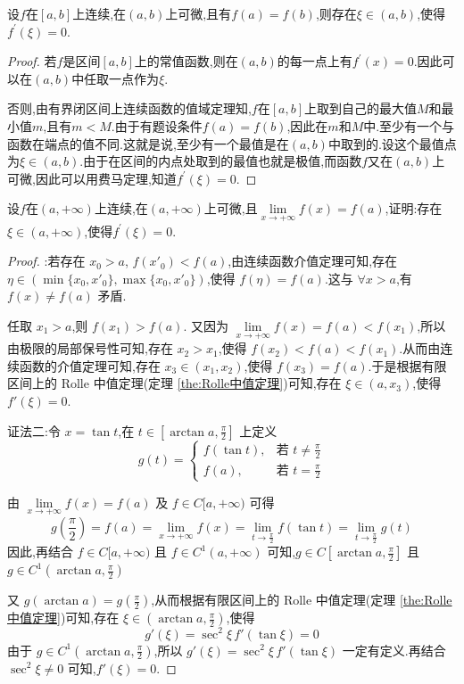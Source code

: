 \documentclass[lang=cn,newtx,10pt,scheme=chinese]{../Template/elegantbook}
\begin{document}
\begin{theorem}\label{the:Rolle中值定理}
    设$f$在$[a,b]$上连续,在$(a,b)$上可微,且有$f(a)=f(b)$,则存在$\xi\in(a,b)$,使得$f^{\prime}(\xi)=0$.
\end{theorem}
\begin{proof}
    若$f$是区间$[a,b]$上的常值函数,则在$(a,b)$的每一点上有$f^{\prime}(x)=0$.因此可以在$(a,b)$中任取一点作为$\xi$.
    
    否则,由有界闭区间上连续函数的值域定理知,$f$在$[a,b]$上取到自己的最大值$M$和最小值$m$,且有$m< M$.由于有题设条件$f(a)=f(b)$,因此在$m$和$M$中.至少有一个与函数在端点的值不同.这就是说,至少有一个最值是在$(a,b)$中取到的.设这个最值点为$\xi\in(a,b)$.由于在区间的内点处取到的最值也就是极值,而函数$f$又在$(a,b)$上可微,因此可以用费马定理,知道$f^{\prime}(\xi)=0$.

\end{proof}

\begin{theorem}\label{the:Rolle中值定理在无限区间上的推广}
    设$f$在$(a,+\infty)$上连续,在$(a,+\infty)$上可微,且$\lim\limits_{x\rightarrow +\infty}f(x)=f(a)$,证明:存在$\xi\in(a,+\infty)$,使得$f^{\prime}(\xi)=0$.
\end{theorem}

\begin{proof}
    {\color{blue} }:若存在 $x_0 > a$, $f(x'_0) < f(a)$,由连续函数介值定理可知,存在 $\eta \in (\min\{x_0, x'_0\}, \max\{x_0, x'_0\})$,使得 $f(\eta) = f(a)$.这与 $\forall x > a$,有 $f(x) \neq f(a)$ 矛盾.

    任取 $x_1 > a$,则 $f(x_1) > f(a)$.
    又因为 $\lim\limits_{x \to +\infty} f(x) = f(a) < f(x_1)$,所以由极限的局部保号性可知,存在 $x_2 > x_1$,使得 $f(x_2) < f(a) < f(x_1)$.从而由连续函数的介值定理可知,存在 $x_3 \in (x_1, x_2)$,使得 $f(x_3) = f(a)$.于是根据有限区间上的 Rolle 中值定理(定理 \ref{the:Rolle中值定理})可知,存在 $\xi \in (a, x_3)$,使得 $f'(\xi) = 0$.

    证法二:令 $x = \tan t$,在 $t \in [\arctan a, \frac{\pi}{2}]$ 上定义
    \[
    g(t) =
    \begin{cases}
        f(\tan t), & \text{若 } t \neq \frac{\pi}{2} \\
        f(a), & \text{若 } t = \frac{\pi}{2}
    \end{cases}
    \]
    
    由 $\lim\limits_{x \to +\infty} f(x) = f(a)$ 及 $f \in C[a, +\infty)$ 可得
    \[
    g\left( \frac{\pi}{2} \right) = f(a) = \lim_{x \to +\infty} f(x) = \lim_{t \to \frac{\pi}{2}} f(\tan t) = \lim_{t \to \frac{\pi}{2}} g(t)
    \]
    因此,再结合 $f \in C[a, +\infty)$ 且 $f \in C^1(a, +\infty)$ 可知,$g \in C[\arctan a, \frac{\pi}{2}]$ 且 $g \in C^1(\arctan a, \frac{\pi}{2})$

    又 $g(\arctan a) = g\left( \frac{\pi}{2} \right)$,从而根据有限区间上的 Rolle 中值定理(定理 \ref{the:Rolle中值定理})可知,存在 $\xi \in (\arctan a, \frac{\pi}{2})$,使得
    \[
    g'(\xi) = \sec^2 \xi \, f'(\tan \xi) = 0
    \]
    由于 $g \in C^1(\arctan a, \frac{\pi}{2})$,所以 $g'(\xi) = \sec^2 \xi \, f'(\tan \xi)$ 一定有定义.再结合 $\sec^2 \xi \neq 0$ 可知,$f'(\xi) = 0$.

\end{proof}
\end{document}
